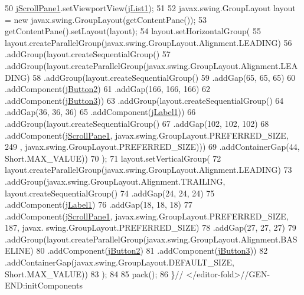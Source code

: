 \begin{DoxyCode}
50         \mbox{\hyperlink{classinterfacessoguar_1_1cu17_a02bf07a587e2b0c668b21a616369e5cb}{jScrollPane1}}.setViewportView(\mbox{\hyperlink{classinterfacessoguar_1_1cu17_a524c114f85a8d7a1c8df04d268ca95c9}{jList1}});
51 
52         javax.swing.GroupLayout layout = \textcolor{keyword}{new} javax.swing.GroupLayout(getContentPane());
53         getContentPane().setLayout(layout);
54         layout.setHorizontalGroup(
55             layout.createParallelGroup(javax.swing.GroupLayout.Alignment.LEADING)
56             .addGroup(layout.createSequentialGroup()
57                 .addGroup(layout.createParallelGroup(javax.swing.GroupLayout.Alignment.LEADING)
58                     .addGroup(layout.createSequentialGroup()
59                         .addGap(65, 65, 65)
60                         .addComponent(\mbox{\hyperlink{classinterfacessoguar_1_1cu17_ab0ec1e2337c482ba36b861315213b157}{jButton2}})
61                         .addGap(166, 166, 166)
62                         .addComponent(\mbox{\hyperlink{classinterfacessoguar_1_1cu17_a5df410d0f4d1de0038eed02645f3c824}{jButton3}}))
63                     .addGroup(layout.createSequentialGroup()
64                         .addGap(36, 36, 36)
65                         .addComponent(\mbox{\hyperlink{classinterfacessoguar_1_1cu17_aa880b94b17154b9daee38aa63d559425}{jLabel1}}))
66                     .addGroup(layout.createSequentialGroup()
67                         .addGap(102, 102, 102)
68                         .addComponent(\mbox{\hyperlink{classinterfacessoguar_1_1cu17_a02bf07a587e2b0c668b21a616369e5cb}{jScrollPane1}}, javax.swing.GroupLayout.PREFERRED\_SIZE, 249
      , javax.swing.GroupLayout.PREFERRED\_SIZE)))
69                 .addContainerGap(44, Short.MAX\_VALUE))
70         );
71         layout.setVerticalGroup(
72             layout.createParallelGroup(javax.swing.GroupLayout.Alignment.LEADING)
73             .addGroup(javax.swing.GroupLayout.Alignment.TRAILING, layout.createSequentialGroup()
74                 .addGap(24, 24, 24)
75                 .addComponent(\mbox{\hyperlink{classinterfacessoguar_1_1cu17_aa880b94b17154b9daee38aa63d559425}{jLabel1}})
76                 .addGap(18, 18, 18)
77                 .addComponent(\mbox{\hyperlink{classinterfacessoguar_1_1cu17_a02bf07a587e2b0c668b21a616369e5cb}{jScrollPane1}}, javax.swing.GroupLayout.PREFERRED\_SIZE, 187, javax.
      swing.GroupLayout.PREFERRED\_SIZE)
78                 .addGap(27, 27, 27)
79                 .addGroup(layout.createParallelGroup(javax.swing.GroupLayout.Alignment.BASELINE)
80                     .addComponent(\mbox{\hyperlink{classinterfacessoguar_1_1cu17_ab0ec1e2337c482ba36b861315213b157}{jButton2}})
81                     .addComponent(\mbox{\hyperlink{classinterfacessoguar_1_1cu17_a5df410d0f4d1de0038eed02645f3c824}{jButton3}}))
82                 .addContainerGap(javax.swing.GroupLayout.DEFAULT\_SIZE, Short.MAX\_VALUE))
83         );
84 
85         pack();
86     \}\textcolor{comment}{// </editor-fold>//GEN-END:initComponents}
\end{DoxyCode}
\mbox{\label{classinterfacessoguar_1_1cu17_ad9063e8cb97f8c0de440afc450b0ffff}} 

